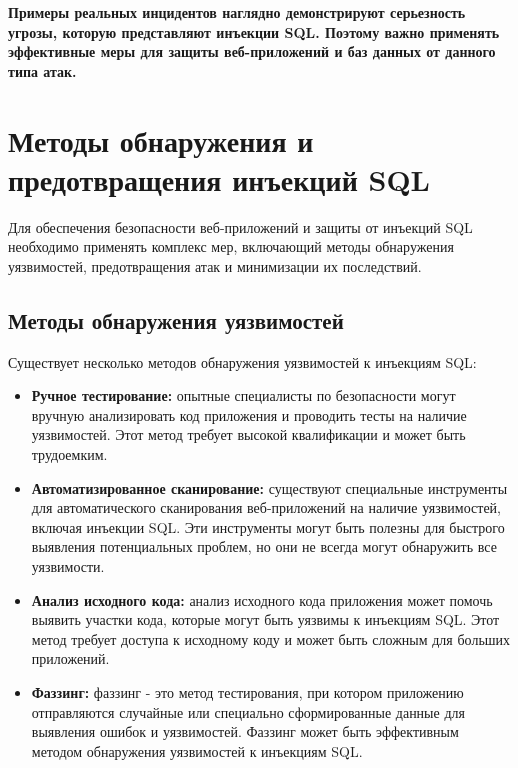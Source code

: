 \documentclass[a4paper,12pt]{diplom}
\begin{document}
	 \textbf{Примеры реальных инцидентов наглядно демонстрируют серьезность угрозы,  которую представляют инъекции SQL.  Поэтому важно применять эффективные меры для защиты веб-приложений и баз данных от данного типа атак.} 
	 
	 
	 
	 
	 
	 
	 
	 
	 
	 \section{Методы обнаружения и предотвращения инъекций SQL}
	 
	 Для обеспечения безопасности веб-приложений и защиты от инъекций SQL необходимо применять комплекс мер,  включающий методы обнаружения уязвимостей,  предотвращения атак и минимизации их последствий. 
	 
	 \subsection{Методы обнаружения уязвимостей}
	 
	 Существует несколько методов обнаружения уязвимостей к инъекциям SQL:
	 
	 \begin{itemize}
	 	\item \textbf{Ручное тестирование:} опытные специалисты по безопасности могут вручную анализировать код приложения и проводить тесты на наличие уязвимостей.  Этот метод требует высокой квалификации и может быть трудоемким. 
	 	\item \textbf{Автоматизированное сканирование:} существуют специальные инструменты для автоматического сканирования веб-приложений на наличие уязвимостей,  включая инъекции SQL.  Эти инструменты могут быть полезны для быстрого выявления потенциальных проблем,  но они не всегда могут обнаружить все уязвимости. 
	 	\item \textbf{Анализ исходного кода:} анализ исходного кода приложения может помочь выявить участки кода, которые могут быть уязвимы к инъекциям SQL.  Этот метод требует доступа к исходному коду и может быть сложным для больших приложений. 
	 	\item \textbf{Фаззинг:} фаззинг - это метод тестирования, при котором приложению отправляются случайные или специально сформированные данные для выявления ошибок и уязвимостей.  Фаззинг может быть эффективным методом обнаружения уязвимостей к инъекциям SQL. 
	 \end{itemize}
	 
\end{document}

